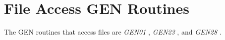\begin{comment}
\documentclass[10pt]{article}
\usepackage{fullpage, graphicx, url}
\setlength{\parskip}{1ex}
\setlength{\parindent}{0ex}
\title{File Access GEN Routines}



\begin{tabular}{ccc}
The Alternative Csound Reference Manual & & \\
Previous &The Standard Numeric Score &Next

\end{tabular}

\end{comment}
\section{File Access GEN Routines}


  The GEN routines that access files are \emph{GEN01}
, \emph{GEN23}
, and \emph{GEN28}
. 


\begin{comment}
\begin{tabular}{lcr}
Previous &Home &Next \\
Line/Exponential Segment Generators &Up &Numeric Value Access GEN Routines

\end{tabular}



\end{comment}
